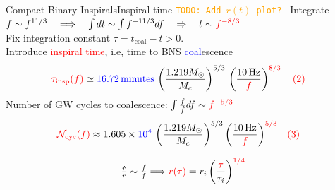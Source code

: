 \documentclass[xcolor=dvipsnames,handout,t]{beamer}
\newcommand{\todo}[1]{\textcolor{orange}{\texttt{TODO: #1}}}
\newcommand{\red}[1]{\textcolor{red}{#1}}
\newcommand{\bl}[1]{\textcolor{blue}{#1}}
\newcommand{\f}{\frac}
\newcommand{\nn}{\nonumber}
\begin{document}
\begin{frame}{Compact Binary Inspirals}{Inspiral time \todo{Add $r(t)$ plot? }}
Integrate $\dot{f} \sim f^{11/3} \quad \Longrightarrow \quad \int dt \sim \int f^{-11/3}df \quad\Rightarrow\quad t \sim \red{f^{-8/3}}$
\\
\vspace{1mm}
Fix integration constant $\tau = t_\text{coal} - t >0$. \\
\vspace{2mm}
Introduce \red{inspiral time}, i.e, time to BNS \bl{coal}escence
%
\begin{align}
 \red{\tau_\text{insp}(f)} %
 &\simeq \bl{16.72\,\text{minutes}} \, \left(\f{1.219 M_\odot}{M_c}\right)^{5/3}\,{\left(\f{10\,\text{Hz}}{\red{f}}\right)^{\red{8/3}}\quad \red{(2)}}\nn
\end{align}
Number of GW cycles to coalescence: $\int \tfrac{f}{\dot{f}}df\sim \red{f^{-5/3}}$ %
\begin{align}
 \red{\mathcal{N}_\text{cyc}(f)} %
 &\approx 1.605\times \bl{10^4}\,\left(\f{1.219 M_\odot}{M_c}\right)^{5/3}{ \left(\f{10\,\text{Hz}}{\red{f}} \right)^{\red{5/3}}}\quad \red{(3)}\nn
\end{align}
%
%
\[ 
\tfrac{\dot{r}}{r}\sim \tfrac{\dot{f}}{f} \Longrightarrow \red{r(\tau)}=r_i \left(\f{\red{\tau}}{\tau_i}\right)^{\red{1/4}}
\]

\end{frame}
\end{document}
